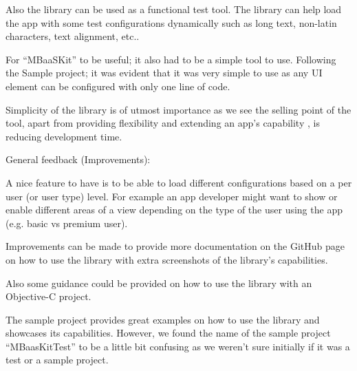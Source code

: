 Also the library can be used as a functional test tool. The library can help load the app with some test configurations dynamically such as long text, non-latin characters, text alignment, etc..

For “MBaaSKit” to be useful; it also had to be a simple tool to use. Following the Sample project; it was evident that it was very simple to use as any UI element can be configured with only one line of code. 

Simplicity of the library is of utmost importance as we see the selling point of the tool, apart from providing flexibility and extending an app’s capability , is reducing development time.

General feedback (Improvements):

A nice feature to have is to be able to load different configurations based on a per user (or user type) level. For example an app developer might want to show or enable different areas of a view depending on the type of the user using the app (e.g. basic vs premium user). 

Improvements can be made to provide more documentation on the GitHub page on how to use the library with extra screenshots of the library’s capabilities. 

Also some guidance could be provided on how to use the library with an Objective-C project.

The sample project provides great examples on how to use the library and showcases its capabilities. However, we found the name of the sample project “MBaasKitTest” to be a little bit confusing as we weren’t sure initially if it was a test or a sample project. \cite{email_2}
